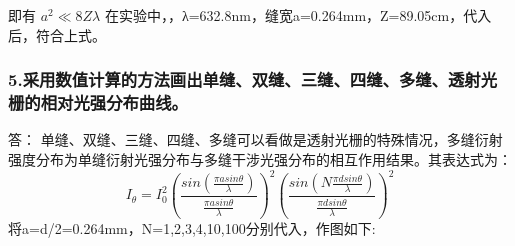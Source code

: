 \documentclass[12pt,a4paper,UTF8]{ctexart}
\begin{document}
即有
$a^2 \ll 8Z \lambda$
在实验中，，λ=632.8nm，缝宽a=0.264mm，Z=89.05cm，代入后，符合上式。 

\subsubsection*{5.采用数值计算的方法画出单缝、双缝、三缝、四缝、多缝、透射光栅的相对光强分布曲线。}
答： 单缝、双缝、三缝、四缝、多缝可以看做是透射光栅的特殊情况，多缝衍射强度分布为单缝衍射光强分布与多缝干涉光强分布的相互作用结果。其表达式为：
\begin{equation*}
	I_θ=I_0^2{\left(\frac{sin(\frac {\pi a sin\theta}{\lambda})}{\frac{\pi asin\theta}{\lambda}}\right)}^2{\left(\frac{sin(N \frac {\pi d sin\theta}{\lambda})}{\frac{\pi d sin\theta}{\lambda}}\right)}^2
\end{equation*}
将a=d/2=0.264mm，N=1,2,3,4,10,100分别代入，作图如下:
\end{document}
